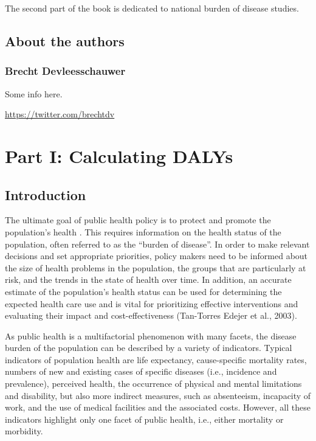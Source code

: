 \documentclass[]{book}
\begin{document}
The second part of the book is dedicated to national burden of disease
studies.

\chapter*{About the authors}\label{about-the-authors}

\section*{Brecht Devleesschauwer}\label{brecht-devleesschauwer}

Some info here.

\url{https://twitter.com/brechtdv}

\part*{Part I: Calculating
DALYs}\label{part-part-i-calculating-dalys}

\chapter{Introduction}\label{introduction}

The ultimate goal of public health policy is to protect and promote the
population's health \citep{devleesschauwer2014quantifying}. This
requires information on the health status of the population, often
referred to as the ``burden of disease''. In order to make relevant
decisions and set appropriate priorities, policy makers need to be
informed about the size of health problems in the population, the groups
that are particularly at risk, and the trends in the state of health
over time. In addition, an accurate estimate of the population's health
status can be used for determining the expected health care use and is
vital for prioritizing effective interventions and evaluating their
impact and cost-effectiveness (Tan-Torres Edejer et al., 2003).

As public health is a multifactorial phenomenon with many facets, the
disease burden of the population can be described by a variety of
indicators. Typical indicators of population health are life expectancy,
cause-specific mortality rates, numbers of new and existing cases of
specific diseases (i.e., incidence and prevalence), perceived health,
the occurrence of physical and mental limitations and disability, but
also more indirect measures, such as absenteeism, incapacity of work,
and the use of medical facilities and the associated costs. However, all
these indicators highlight only one facet of public health, i.e., either
mortality or morbidity.
\end{document}
